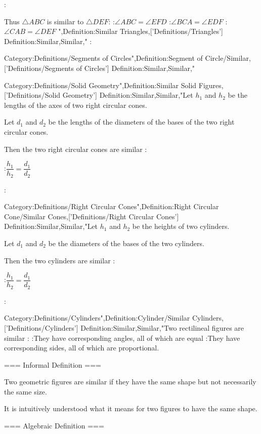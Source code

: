 :

Thus $\triangle ABC$ is similar to $\triangle DEF$:
:$\angle ABC = \angle EFD$
:$\angle BCA = \angle EDF$
:$\angle CAB = \angle DEF$
",Definition:Similar Triangles,['Definitions/Triangles']
Definition:Similar,Similar,"
:



Category:Definitions/Segments of Circles",Definition:Segment of Circle/Similar,['Definitions/Segments of Circles']
Definition:Similar,Similar,"



Category:Definitions/Solid Geometry",Definition:Similar Solid Figures,['Definitions/Solid Geometry']
Definition:Similar,Similar,"Let $h_1$ and $h_2$ be the lengths of the axes of two right circular cones.

Let $d_1$ and $d_2$ be the lengths of the diameters of the bases of the two right circular cones.

Then the two right circular cones are similar :

:$\dfrac {h_1} {h_2} = \dfrac {d_1} {d_2}$



:



Category:Definitions/Right Circular Cones",Definition:Right Circular Cone/Similar Cones,['Definitions/Right Circular Cones']
Definition:Similar,Similar,"Let $h_1$ and $h_2$ be the heights of two cylinders.

Let $d_1$ and $d_2$ be the diameters of the bases of the two cylinders.

Then the two cylinders are similar :

:$\dfrac {h_1} {h_2} = \dfrac {d_1} {d_2}$



:



Category:Definitions/Cylinders",Definition:Cylinder/Similar Cylinders,['Definitions/Cylinders']
Definition:Similar,Similar,"Two rectilineal figures are similar :
:They have corresponding angles, all of which are equal
:They have corresponding sides, all of which are proportional.


=== Informal Definition ===

Two geometric figures are similar if they have the same shape but not necessarily the same size.

It is intuitively understood what it means for two figures to have the same shape.


=== Algebraic Definition ===

